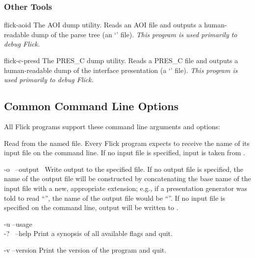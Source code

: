 \subsubsection{Other Tools}
\begin{optionlist}
  \item[flick-aoid] The AOI dump utility.  Reads an AOI file and outputs a
  human-readable dump of the parse tree (an `' file).
  \emph{This program is used primarily to debug Flick.}

  \item[flick-c-presd] The PRES\_C dump utility.  Reads a PRES\_C file and
  outputs a human-readable dump of the interface presentation (a
  `' file).  \emph{This program is used primarily to debug
  Flick.}

\end{optionlist}



\subsection{Common Command Line Options}
\label{subsec:Common Command Line Options}

All Flick programs support these command line arguments and options:

\begin{optionlist}
  \item[\optionarg{input}]
  Read from the named  file.  Every Flick program expects to
  receive the name of its input file on the command line.  If no input file is
  specified, input is taken from .

  \item[-o~\optionarg{filename} \oroption{} --output~\optionarg{filename}]
  Write output to the specified file.  If no output file is specified, the name
  of the output file will be constructed by concatenating the base name of the
  input file with a new, appropriate extension; e.g., if a presentation
  generator was told to read ``'', the name of the output
  file would be ``''.  If no input file is specified on the
  command line, output will be written to .

  \item[-u \oroption{} --usage \oroption{}\\ -?\ \oroption{} --help]
  Print a synopsis of all available flags and quit.
  \optionpad{}

  \item[-v \oroption{} --version]
  Print the version of the program and quit.
\end{optionlist}

